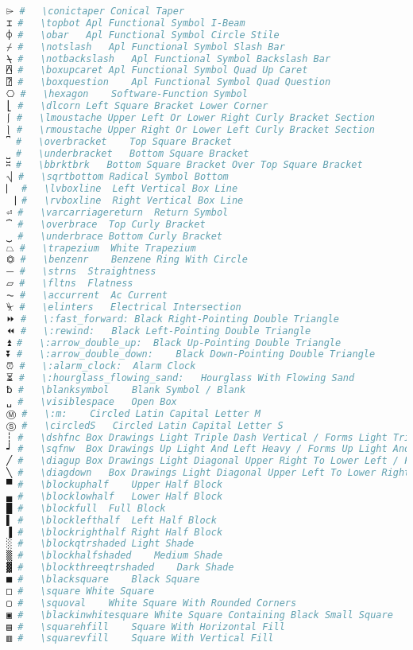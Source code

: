 \begin{lstlisting}[language=Julia, linewidth=\textwidth]
⌲ #   \conictaper Conical Taper
⌶ #   \topbot Apl Functional Symbol I-Beam
⌽ #   \obar   Apl Functional Symbol Circle Stile
⌿ #   \notslash   Apl Functional Symbol Slash Bar
⍀ #   \notbackslash   Apl Functional Symbol Backslash Bar
⍓ #   \boxupcaret Apl Functional Symbol Quad Up Caret
⍰ #   \boxquestion    Apl Functional Symbol Quad Question
⎔ #   \hexagon    Software-Function Symbol
⎣ #   \dlcorn Left Square Bracket Lower Corner
⎰ #   \lmoustache Upper Left Or Lower Right Curly Bracket Section
⎱ #   \rmoustache Upper Right Or Lower Left Curly Bracket Section
⎴ #   \overbracket    Top Square Bracket
⎵ #   \underbracket   Bottom Square Bracket
⎶ #   \bbrktbrk   Bottom Square Bracket Over Top Square Bracket
⎷ #   \sqrtbottom Radical Symbol Bottom
⎸ #   \lvboxline  Left Vertical Box Line
⎹ #   \rvboxline  Right Vertical Box Line
⏎ #   \varcarriagereturn  Return Symbol
⏞ #   \overbrace  Top Curly Bracket
⏟ #   \underbrace Bottom Curly Bracket
⏢ #   \trapezium  White Trapezium
⏣ #   \benzenr    Benzene Ring With Circle
⏤ #   \strns  Straightness
⏥ #   \fltns  Flatness
⏦ #   \accurrent  Ac Current
⏧ #   \elinters   Electrical Intersection
⏩ #   \:fast_forward: Black Right-Pointing Double Triangle
⏪ #   \:rewind:   Black Left-Pointing Double Triangle
⏫ #   \:arrow_double_up:  Black Up-Pointing Double Triangle
⏬ #   \:arrow_double_down:    Black Down-Pointing Double Triangle
⏰ #   \:alarm_clock:  Alarm Clock
⏳ #   \:hourglass_flowing_sand:   Hourglass With Flowing Sand
␢ #   \blanksymbol    Blank Symbol / Blank
␣ #   \visiblespace   Open Box
Ⓜ #   \:m:    Circled Latin Capital Letter M
Ⓢ #   \circledS   Circled Latin Capital Letter S
┆ #   \dshfnc Box Drawings Light Triple Dash Vertical / Forms Light Triple Dash Vertical
┙ #   \sqfnw  Box Drawings Up Light And Left Heavy / Forms Up Light And Left Heavy
╱ #   \diagup Box Drawings Light Diagonal Upper Right To Lower Left / Forms Light Diagonal Upper Right To Lower Left
╲ #   \diagdown   Box Drawings Light Diagonal Upper Left To Lower Right / Forms Light Diagonal Upper Left To Lower Right
▀ #   \blockuphalf    Upper Half Block
▄ #   \blocklowhalf   Lower Half Block
█ #   \blockfull  Full Block
▌ #   \blocklefthalf  Left Half Block
▐ #   \blockrighthalf Right Half Block
░ #   \blockqtrshaded Light Shade
▒ #   \blockhalfshaded    Medium Shade
▓ #   \blockthreeqtrshaded    Dark Shade
■ #   \blacksquare    Black Square
□ #   \square White Square
▢ #   \squoval    White Square With Rounded Corners
▣ #   \blackinwhitesquare White Square Containing Black Small Square
▤ #   \squarehfill    Square With Horizontal Fill
▥ #   \squarevfill    Square With Vertical Fill

\end{lstlisting}
